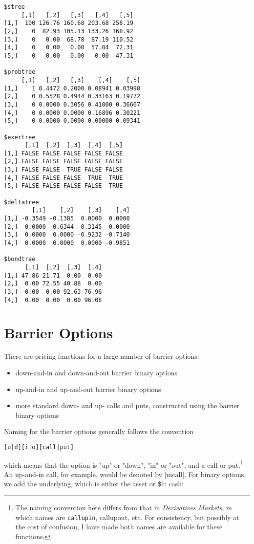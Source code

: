 \documentclass{article}\usepackage[]{graphicx}\usepackage[]{color}
\makeatletter
\newenvironment{kframe}{%
 \def\at@end@of@kframe{}%
 \ifinner\ifhmode%
  \def\at@end@of@kframe{\end{minipage}}%
  \begin{minipage}{\columnwidth}%
 \fi\fi%
 \def\FrameCommand##1{\hskip\@totalleftmargin \hskip-\fboxsep
 \colorbox{shadecolor}{##1}\hskip-\fboxsep
     \hskip-\linewidth \hskip-\@totalleftmargin \hskip\columnwidth}%
 \MakeFramed {\advance\hsize-\width
   \@totalleftmargin\z@ \linewidth\hsize
   \@setminipage}}%
 {\par\unskip\endMakeFramed%
 \at@end@of@kframe}
\newenvironment{knitrout}{}{} %
\makeatother
\begin{document}
\begin{knitrout}
\begin{kframe}
\begin{verbatim}
$stree
     [,1]   [,2]   [,3]   [,4]   [,5]
[1,]  100 126.76 160.68 203.68 258.19
[2,]    0  82.93 105.13 133.26 168.92
[3,]    0   0.00  68.78  87.19 110.52
[4,]    0   0.00   0.00  57.04  72.31
[5,]    0   0.00   0.00   0.00  47.31

$probtree
     [,1]   [,2]   [,3]    [,4]    [,5]
[1,]    1 0.4472 0.2000 0.08941 0.03998
[2,]    0 0.5528 0.4944 0.33163 0.19772
[3,]    0 0.0000 0.3056 0.41000 0.36667
[4,]    0 0.0000 0.0000 0.16896 0.30221
[5,]    0 0.0000 0.0000 0.00000 0.09341

$exertree
      [,1]  [,2]  [,3]  [,4]  [,5]
[1,] FALSE FALSE FALSE FALSE FALSE
[2,] FALSE FALSE FALSE FALSE FALSE
[3,] FALSE FALSE  TRUE FALSE FALSE
[4,] FALSE FALSE FALSE  TRUE  TRUE
[5,] FALSE FALSE FALSE FALSE  TRUE

$deltatree
        [,1]    [,2]    [,3]    [,4]
[1,] -0.3549 -0.1385  0.0000  0.0000
[2,]  0.0000 -0.6344 -0.3145  0.0000
[3,]  0.0000  0.0000 -0.9232 -0.7140
[4,]  0.0000  0.0000  0.0000 -0.9851

$bondtree
      [,1]  [,2]  [,3]  [,4]
[1,] 47.86 21.71  0.00  0.00
[2,]  0.00 72.55 40.88  0.00
[3,]  0.00  0.00 92.63 76.96
[4,]  0.00  0.00  0.00 96.08
\end{verbatim}
\end{kframe}
\end{knitrout}



\section{Barrier Options}

There are pricing functions for a large number of barrier options: 

\begin{itemize}
\item down-and-in and down-and-out barrier binary options 
\item  up-and-in and up-and-out barrier binary options 
\item  more standard
  down- and up- calls and puts, constructed using the barrier binary
  options
\end{itemize}
Naming for the barrier options generally follows the convention
\begin{verbatim}
[u|d][i|o][call|put]
\end{verbatim}
which means that the option is "up" or "down", "in" or "out", and a
call or put.\footnote{The naming convention here differs from that in
\emph{Derivatives Markets}, in which names are \lstinline{callupin}, callupout,
etc. For consistency, but possibly at the cost of confusion, I have
made both names are available for these functions.}  An up-and-in
call, for example, would be denoted by |uicall|. For binary options,
we add the underlying, which is either the asset or \$1:
cash:
\end{document}
